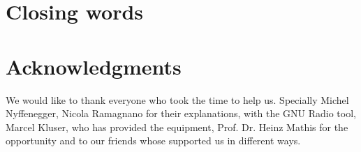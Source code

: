 \section{Closing words}

\section{Acknowledgments}


We would like to thank everyone who took the time to help us. Specially Michel Nyffenegger, Nicola Ramagnano for their explanations, with the GNU Radio tool,
Marcel Kluser, who has provided the equipment, Prof. Dr. Heinz Mathis for the opportunity and to our friends whose supported us in different ways.



